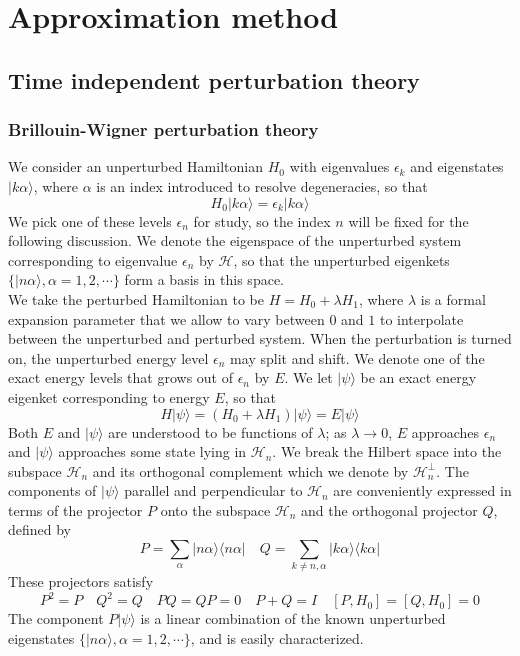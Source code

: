 \chapter{Approximation method}
\section{Time independent perturbation theory}
\subsection{Brillouin-Wigner perturbation theory}
We consider an unperturbed Hamiltonian $H_0$ with eigenvalues $\epsilon_k$ and eigenstates $|k\alpha\rangle$, where $\alpha$ is an index introduced to resolve degeneracies, so that
\[H_0 |k\alpha\rangle = \epsilon_k |k\alpha\rangle\]
We pick one of these levels $\epsilon_n$ for study, so the index $n$ will be fixed for the following discussion. We denote the eigenspace of the unperturbed system corresponding to eigenvalue  $\epsilon_n$ by $\mathcal{H}$, so that the unperturbed eigenkets
$\{ |n\alpha\rangle, \alpha = 1,2,\cdots\}$ form a basis in this space.\\
We take the perturbed Hamiltonian to be $H = H_0 + \lambda H_1$, where $\lambda$ is a formal expansion parameter that we allow to vary between $0$ and $1$ to interpolate between the unperturbed and perturbed system. When the perturbation is turned on, the unperturbed energy level $\epsilon_n$ may split and shift. We denote one of the exact energy levels that grows out of $\epsilon_n$ by $E$. We let $|\psi\rangle$ be an exact energy eigenket corresponding to energy $E$, so that
\[H|\psi\rangle = (H_0 + \lambda H_1)|\psi\rangle = E|\psi\rangle\]
Both $E$ and $|\psi\rangle$ are understood to be functions of $\lambda$; as $\lambda \to 0$, $E$ approaches $\epsilon_n$ and $|\psi\rangle$ approaches some state lying in $\mathcal{H}_n$. We break the Hilbert space into the subspace $\mathcal{H}_n$ and its orthogonal complement which we denote by $\mathcal{H}_n^{\bot}$. The components of $|\psi\rangle$ parallel and perpendicular to $\mathcal{H}_n$ are conveniently expressed in terms of the projector $P$ onto the subspace $\mathcal{H}_n$ and the orthogonal projector $Q$, defined by
\[P = \sum_{\alpha} |n\alpha\rangle \langle n\alpha| \quad Q = \sum_{k \neq n,\alpha} |k\alpha\rangle \langle k\alpha|\]
These projectors satisfy
\[P^2=P \quad Q^2=Q \quad PQ=QP=0 \quad P+Q=I \quad [P,H_0]=[Q,H_0]=0\]
The component $P|\psi\rangle$ is a linear combination of the known unperturbed eigenstates $\{ |n\alpha\rangle, \alpha = 1,2,\cdots\}$, and is easily characterized. 
